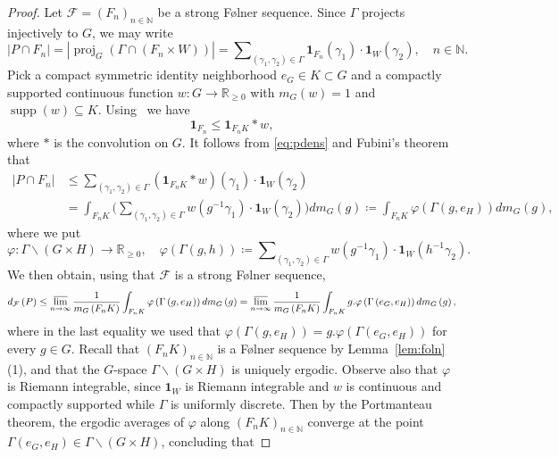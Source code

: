 \documentclass{amsart}
\numberwithin{equation}{subsection}
\theoremstyle{remark}
\begin{document}
\begin{proof}
Let \(\mathcal{F}=\left(F_{n}\right)_{n\in\mathbb{N}}\) be a strong F\o lner sequence. Since \(\Gamma\) projects injectively to \(G\), we may write
\begin{equation}\label{eq:pdens}
\left|P\cap F_{n}\right|=\left|\operatorname{proj}_{G}\left(\Gamma\cap\left(F_{n}\times W\right)\right)\right|=\sum\nolimits_{\left(\gamma_{1},\gamma_{2}\right)\in\Gamma}\mathbf{1}_{F_{n}}\left(\gamma_{1}\right)\cdot \mathbf{1}_{W}\left(\gamma_{2}\right),\quad n\in\mathbb{N}.
\end{equation}
Pick a compact symmetric identity neighborhood \(e_{G}\in K\subset G\) and a compactly supported continuous function \(w:G\to\mathbb{R}_{\geq 0}\) with \(m_{G}\left(w\right)=1\) and \(\operatorname{supp}\left(w\right)\subseteq K\). Using~\cite[Lemma 5.11]{BjHa2022} we have
\[\mathbf{1}_{F_{n}}\leq\mathbf{1}_{F_{n}K}\ast w,\]
where \(\ast\) is the convolution on \(G\). It follows from \eqref{eq:pdens} and Fubini's theorem that
\begin{align*}
\left|P\cap F_{n}\right|
&\leq\sum\nolimits_{\left(\gamma_{1},\gamma_{2}\right)\in\Gamma}\left(\mathbf{1}_{F_{n}K}\ast w\right)\left(\gamma_{1}\right)\cdot\mathbf{1}_{W}\left(\gamma_{2}\right)\\
&=\int_{F_{n}K}\Big(\sum\nolimits_{\left(\gamma_{1},\gamma_{2}\right)\in\Gamma}w\left(g^{-1}\gamma_{1}\right)\cdot\mathbf{1}_{W}\left(\gamma_{2}\right)\Big)dm_{G}\left(g\right)\coloneqq\int_{F_{n}K}\varphi\left(\Gamma\left(g,e_{H}\right)\right)dm_{G}\left(g\right),
\end{align*}
where we put
\[\varphi:\Gamma\backslash\left(G\times H\right)\longrightarrow\mathbb{R}_{\geq 0},\quad \varphi\left(\Gamma\left(g,h\right)\right)\coloneqq\sum\nolimits_{\left(\gamma_{1},\gamma_{2}\right)\in\Gamma}w\left(g^{-1}\gamma_{1}\right)\cdot\mathbf{1}_{W}\left(h^{-1}\gamma_{2}\right).\]
We then obtain, using that \(\mathcal{F}\) is a strong F\o lner sequence,
\[d_{\mathcal{F}}\left(P\right)\leq\varlimsup_{n\to\infty}\frac{1}{m_{G}\left(F_{n}K\right)}\int_{F_{n}K}\varphi\left(\Gamma\left(g,e_{H}\right)\right)dm_{G}\left(g\right)=\varlimsup_{n\to\infty}\frac{1}{m_{G}\left(F_{n}K\right)}\int_{F_{n}K}g.\varphi\left(\Gamma\left(e_{G},e_{H}\right)\right)dm_{G}\left(g\right),\]
where in the last equality we used that \(\varphi\left(\Gamma\left(g,e_{H}\right)\right)=g.\varphi\left(\Gamma\left(e_{G},e_{H}\right)\right)\) for every \(g\in G\). Recall that \(\left(F_{n}K\right)_{n\in\mathbb{N}}\) is a F\o lner sequence by Lemma~\ref{lem:foln}(1), and that the \(G\)-space \(\Gamma\backslash\left(G\times H\right)\) is uniquely ergodic. Observe also that \(\varphi\) is Riemann integrable, since \(\mathbf{1}_{W}\) is Riemann integrable and \(w\) is continuous and compactly supported while \(\Gamma\) is uniformly discrete. Then by the Portmanteau theorem, the ergodic averages of \(\varphi\) along \(\left(F_{n}K\right)_{n\in\mathbb{N}}\) converge at the point \(\Gamma\left(e_{G},e_{H}\right)\in\Gamma\backslash\left(G\times H\right)\), concluding that

\end{proof}
\end{document}
